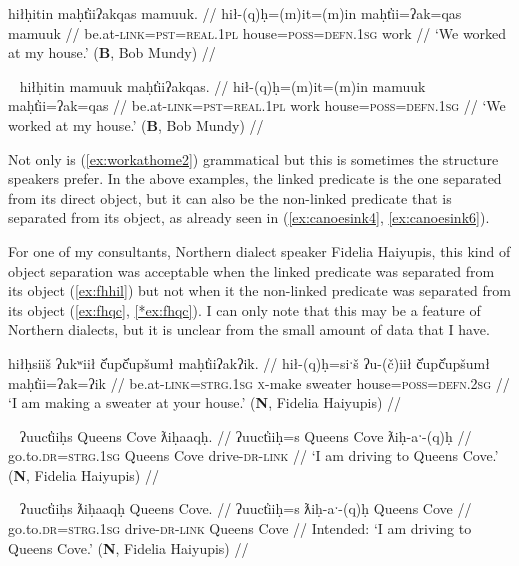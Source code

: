\ex \label{ex:workathome}
\begingl
\glpreamble hiłḥitin maḥt̓iiʔakqas mamuuk. //
\gla hił-(q)ḥ=(m)it=(m)in maḥt̓ii=ʔak=qas mamuuk //
\glb be.at-\textsc{link}=\textsc{pst}=\textsc{real.1pl} house=\textsc{poss}=\textsc{defn.1sg} work //
\glft `We worked at my house.' (\textbf{B}, Bob Mundy) //
\endgl
\xe

\ex~ \label{ex:workathome2}
\begingl
\glpreamble hiłḥitin mamuuk maḥt̓iiʔakqas. //
\gla hił-(q)ḥ=(m)it=(m)in mamuuk maḥt̓ii=ʔak=qas //
\glb be.at-\textsc{link}=\textsc{pst}=\textsc{real.1pl} work house=\textsc{poss}=\textsc{defn.1sg} //
\glft `We worked at my house.' (\textbf{B}, Bob Mundy) //
\endgl
\xe

Not only is (\ref{ex:workathome2}) grammatical but this is sometimes the structure speakers prefer. In the above examples, the linked predicate is the one separated from its direct object, but it can also be the non-linked predicate that is separated from its object, as already seen in (\ref{ex:canoesink4}, \ref{ex:canoesink6}).

For one of my consultants, Northern dialect speaker Fidelia Haiyupis, this kind of object separation was acceptable when the linked predicate was separated from its object (\ref{ex:fhhil}) but not when it the non-linked predicate was separated from its object (\ref{ex:fhqc}, \ref{*ex:fhqc}). I can only note that this may be a feature of Northern dialects, but it is unclear from the small amount of data that I have.

\ex \label{ex:fhhil}
\begingl
\glpreamble hiłḥsiiš ʔukʷiił č̓upč̓upšumł maḥt̓iiʔakʔik. //
\gla hił-(q)ḥ=siˑš ʔu-(č)iił č̓upč̓upšumł maḥt̓ii=ʔak=ʔik //
\glb be.at-\textsc{link}=\textsc{strg.1sg} \textsc{x}-make sweater house=\textsc{poss}=\textsc{defn.2sg} //
\glft `I am making a sweater at your house.' (\textbf{N}, Fidelia Haiyupis) //
\endgl
\xe

\ex~ \label{ex:fhqc}
\begingl
\glpreamble ʔuuct̓iiḥs Queens Cove ƛiḥaaqḥ. //
\gla ʔuuct̓iiḥ=s Queens Cove ƛiḥ-aˑ-(q)ḥ //
\glb go.to.\textsc{dr}=\textsc{strg.1sg} Queens Cove drive-\textsc{dr}-\textsc{link} //
\glft `I am driving to Queens Cove.' (\textbf{N}, Fidelia Haiyupis) //
\endgl
\xe

\ex~ \label{*ex:fhqc}
\begingl
\glpreamble *ʔuuct̓iiḥs ƛiḥaaqḥ Queens Cove. //
\gla ʔuuct̓iiḥ=s ƛiḥ-aˑ-(q)ḥ Queens Cove //
\glb go.to.\textsc{dr}=\textsc{strg.1sg} drive-\textsc{dr}-\textsc{link} Queens Cove //
\glft Intended: `I am driving to Queens Cove.' (\textbf{N}, Fidelia Haiyupis) //
\endgl
\xe

